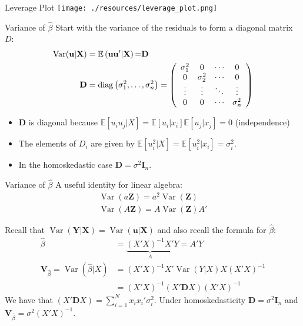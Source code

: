 \documentclass[aspectratio=169]{beamer}
\begin{document}
\begin{frame}{Leverage Plot}
\texttt{[image: ./resources/leverage\_plot.png]}
\end{frame}



\begin{frame}{Variance of $\widehat{\beta}$}
Start with the variance of the residuals to form a \alert{diagonal} matrix $D$:
\begin{align*}
\operatorname { Var } ( \mathbf{u} | \mathbf { X } ) &= \mathbb { E } \left( \mathbf{u u} ^ { \prime } | \mathbf { X } \right){ = } \mathbf { D }\\
\mathbf { D } &= \operatorname { diag } \left( \sigma _ { 1 } ^ { 2 } , \ldots , \sigma _ { n } ^ { 2 } \right) = \left( \begin{array} { c c c c } { \sigma _ { 1 } ^ { 2 } } & { 0 } & { \cdots } & { 0 } \\ { 0 } & { \sigma _ { 2 } ^ { 2 } } & { \cdots } & { 0 } \\ { \vdots } & { \vdots } & { \ddots } & { \vdots } \\ { 0 } & { 0 } & { \cdots } & { \sigma _ { n } ^ { 2 } } \end{array} \right)
\end{align*}
\begin{itemize}
\item $\mathbf{D}$ is diagonal because $\mathbb { E }[u_i u_j | X] = \mathbb { E }[u_i  | x_i]  \mathbb { E }[u_j  | x_j]=0$ (independence)
\item The elements of $D_i$ are given by $\mathbb { E }[u_i^2 | X] = \mathbb { E }[u_i^2 | x_i] = \sigma_i^2$.
\item In the \alert{homoskedastic} case $\mathbf{D} = \sigma^2 \mathbf{I}_n$.
\end{itemize}
\end{frame}

\begin{frame}{Variance of $\widehat{\beta}$}
A useful identity for linear algebra:
\begin{align*}
\operatorname { Var } (a \mathbf{Z} ) = a^2 \operatorname { Var }(\mathbf{Z})\\
\operatorname { Var } (A \mathbf{Z} ) = A \operatorname { Var }(\mathbf{Z}) A'
\end{align*}

Recall that $\operatorname { Var } ( \mathbf{Y} |\mathbf{X} )  = \operatorname { Var } ( \mathbf{u} | \mathbf { X } ) $ and also
recall the formula for $\widehat{\beta}$:
\begin{align*}
\widehat{\beta} &= \underbrace{(X'X)^{-1} X' }_{A} Y= A' Y \\
\mathbf{V}_{\widehat{\beta}} = \operatorname { Var }(\widehat{\beta} | X)&= (X'X)^{-1} X'  \operatorname { Var }(Y| X) X (X'X)^{-1} \\
													     &= (X'X)^{-1} (X'  \mathbf{D} X) (X'X)^{-1} 
\end{align*}
We have that $ (X'  \mathbf{D} X)  = \sum_{i=1}^N x_i x_i'\sigma_i^2$. Under homoskedasticity $\mathbf{D} = \sigma^2 \mathbf{I}_n$ and $\mathbf{V}_{\widehat{\beta}} = \sigma^2 (X'X)^{-1}$.
\end{frame}
\end{document}
